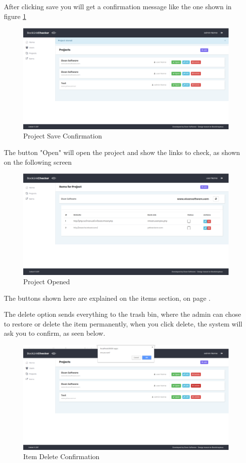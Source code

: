 After clicking save you will get a confirmation message like the one shown in figure \ref{img:confirm}
\begin{figure}[H]
	\caption{Project Save Confirmation}
	\label{img:confirm}
	\includegraphics[width=\textwidth]{images/project_stored}
\end{figure}
The button "Open" will open the project and show the links to check, as shown on the following screen
\begin{figure}[H]
	\caption{Project Opened}
	\label{img:prjopened}
	\includegraphics[width=\textwidth]{images/items_for_project}
\end{figure}
The buttons shown here are explained on the items section, on page \pageref{sec:item}.

The delete option sends everything to the trash bin, where the admin can chose to restore or delete the item permanently, when you click delete, the system will ask you to confirm, as seen below.
\begin{figure}[H]
	\caption{Item Delete Confirmation}
	\label{img:prjdel}
	\includegraphics[width=\textwidth]{images/project_delete}
\end{figure}


